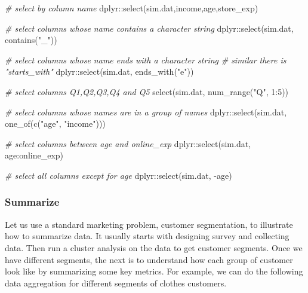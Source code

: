 \documentclass[
  12pt,
]{krantz}
\makeatletter
\newenvironment{Shaded}{\begin{snugshade}}{\end{snugshade}}
\newcommand{\CommentTok}[1]{\textcolor[rgb]{0.37,0.37,0.37}{\textit{#1}}}
\newcommand{\DecValTok}[1]{\textcolor[rgb]{0.06,0.06,0.06}{#1}}
\newcommand{\FunctionTok}[1]{\textcolor[rgb]{0,0,0}{#1}}
\newcommand{\NormalTok}[1]{#1}
\newcommand{\SpecialCharTok}[1]{\textcolor[rgb]{0,0,0}{#1}}
\newcommand{\StringTok}[1]{\textcolor[rgb]{0.5,0.5,0.5}{#1}}
\newenvironment{kframe}{%
\medskip{}
\setlength{\fboxsep}{.8em}
 \def\at@end@of@kframe{}%
 \ifinner\ifhmode%
  \def\at@end@of@kframe{\end{minipage}}%
  \begin{minipage}{\columnwidth}%
 \fi\fi%
 \def\FrameCommand##1{\hskip\@totalleftmargin \hskip-\fboxsep
 \colorbox{shadecolor}{##1}\hskip-\fboxsep
     \hskip-\linewidth \hskip-\@totalleftmargin \hskip\columnwidth}%
 \MakeFramed {\advance\hsize-\width
   \@totalleftmargin\z@ \linewidth\hsize
   \@setminipage}}%
 {\par\unskip\endMakeFramed%
 \at@end@of@kframe}
\renewenvironment{Shaded}{\begin{kframe}}{\end{kframe}}
\makeatother
\begin{document}
\begin{Shaded}
\begin{Highlighting}[]
\CommentTok{\# select by column name}
\NormalTok{dplyr}\SpecialCharTok{::}\FunctionTok{select}\NormalTok{(sim.dat,income,age,store\_exp)}

\CommentTok{\# select columns whose name contains a character string}
\NormalTok{dplyr}\SpecialCharTok{::}\FunctionTok{select}\NormalTok{(sim.dat, }\FunctionTok{contains}\NormalTok{(}\StringTok{"\_"}\NormalTok{))}

\CommentTok{\# select columns whose name ends with a character string}
\CommentTok{\# similar there is "starts\_with"}
\NormalTok{dplyr}\SpecialCharTok{::}\FunctionTok{select}\NormalTok{(sim.dat, }\FunctionTok{ends\_with}\NormalTok{(}\StringTok{"e"}\NormalTok{))}

\CommentTok{\# select columns Q1,Q2,Q3,Q4 and Q5}
\FunctionTok{select}\NormalTok{(sim.dat, }\FunctionTok{num\_range}\NormalTok{(}\StringTok{"Q"}\NormalTok{, }\DecValTok{1}\SpecialCharTok{:}\DecValTok{5}\NormalTok{)) }

\CommentTok{\# select columns whose names are in a group of names}
\NormalTok{dplyr}\SpecialCharTok{::}\FunctionTok{select}\NormalTok{(sim.dat, }\FunctionTok{one\_of}\NormalTok{(}\FunctionTok{c}\NormalTok{(}\StringTok{"age"}\NormalTok{, }\StringTok{"income"}\NormalTok{)))}

\CommentTok{\# select columns between age and online\_exp}
\NormalTok{dplyr}\SpecialCharTok{::}\FunctionTok{select}\NormalTok{(sim.dat, age}\SpecialCharTok{:}\NormalTok{online\_exp)}

\CommentTok{\# select all columns except for age}
\NormalTok{dplyr}\SpecialCharTok{::}\FunctionTok{select}\NormalTok{(sim.dat, }\SpecialCharTok{{-}}\NormalTok{age)}
\end{Highlighting}
\end{Shaded}

\hypertarget{summarize}{%
\subsubsection{Summarize}\label{summarize}}

Let us use a standard marketing problem, customer segmentation, to illustrate how to summarize data. It usually starts with designing survey and collecting data. Then run a cluster analysis on the data to get customer segments. Once we have different segments, the next is to understand how each group of customer look like by summarizing some key metrics. For example, we can do the following data aggregation for different segments of clothes customers.
\end{document}
